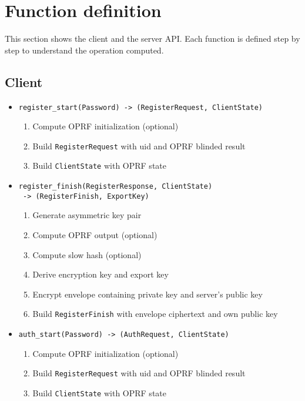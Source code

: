 ﻿\documentclass[../report.tex]{subfiles}
\begin{document}
\section{Function definition} \label{sec:impl_function_def}
This section shows the client and the server API.
Each function is defined step by step to understand the operation computed.
\subsection{Client}
\begin{itemize}
 \item \verb|register_start(Password) -> (RegisterRequest, ClientState)|
  \begin{enumerate}
    \item Compute OPRF initialization (optional)
    \item Build \verb|RegisterRequest| with uid and OPRF blinded result
    \item Build \verb|ClientState| with OPRF state
  \end{enumerate}
  
 \item \verb|register_finish(RegisterResponse, ClientState)|\\
       \verb| -> (RegisterFinish, ExportKey)|
  \begin{enumerate}
    \item Generate asymmetric key pair
    \item Compute OPRF output (optional)
    \item Compute slow hash (optional)
    \item Derive encryption key and export key
    \item Encrypt envelope containing private key and server's public key
    \item Build \verb|RegisterFinish| with envelope ciphertext and own public key
  \end{enumerate}
 
 
 
 \item \verb|auth_start(Password) -> (AuthRequest, ClientState)|
   \begin{enumerate}
    \item Compute OPRF initialization (optional)
    \item Build \verb|RegisterRequest| with uid and OPRF blinded result
    \item Build \verb|ClientState| with OPRF state
  \end{enumerate}
  

\end{itemize}
\end{document}
